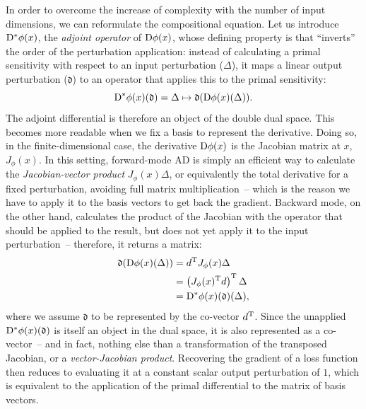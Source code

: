 In order to overcome the increase of complexity with the number of input dimensions, we can
reformulate the compositional equation.  Let us introduce \(\mathop{}\!\mathrm{D}^{*} \phi(x)\), the \emph{adjoint
  operator} of \(\mathop{}\!\mathrm{D} \phi(x)\), whose defining property is that \enquote{inverts} the order of the
perturbation application: instead of calculating a primal sensitivity with respect to an input
perturbation (\(\Delta\)), it maps a linear output perturbation (\(\mathfrak{d}\)) to an operator
that applies this to the primal sensitivity:
\begin{equation}
  \mathop{}\!\mathrm{D}^{*} \phi(x)(\mathfrak{d}) = \Delta \mapsto \mathfrak{d}(\mathop{}\!\mathrm{D} \phi(x)(\Delta)).
\end{equation}
The adjoint differential is therefore an object of the double dual space.  This becomes more
readable when we fix a basis to represent the derivative.  Doing so, in the finite-dimensional case,
the derivative \(\mathop{}\!\mathrm{D} \phi(x)\) is the Jacobian matrix at \(x\), \(J_{\phi}(x)\).  In this setting,
forward-mode AD is simply an efficient way to calculate the \emph{Jacobian-vector product}
\(J_{\phi}(x) \Delta\), or equivalently the total derivative for a fixed perturbation, avoiding full
matrix multiplication~-- which is the reason we have to apply it to the basis vectors to get back
the gradient.  Backward mode, on the other hand, calculates the product of the Jacobian with the
operator that should be applied to the result, but does not yet apply it to the input
perturbation~-- therefore, it returns a matrix:
\begin{equation}
  \begin{aligned}
    \mathfrak{d} (\mathop{}\!\mathrm{D} \phi(x)(\Delta)) &= d^{\mathrm{T}} J_{\phi}(x) \Delta \\
    &= \left( J_{\phi}(x)^{\mathrm{T}} d \right)^{\mathrm{T}} \Delta \\
    &= \mathop{}\!\mathrm{D}^{*} \phi(x)(\mathfrak{d})(\Delta),
  \end{aligned}
\end{equation}
where we assume \(\mathfrak{d}\) to be represented by the co-vector \(d^{\mathrm{T}}\).  Since the
unapplied \(\mathop{}\!\mathrm{D}^{*} \phi(x)(\mathfrak{d})\) is itself an object in the dual space, it is also
represented as a co-vector~-- and in fact, nothing else than a transformation of the transposed
Jacobian, or a \emph{vector-Jacobian product}.  Recovering the gradient of a loss function then
reduces to evaluating it at a constant scalar output perturbation of \(1\), which is equivalent to
the application of the primal differential to the matrix of basis vectors.

